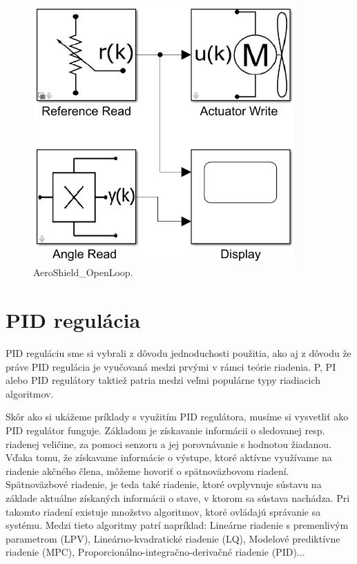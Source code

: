 \begin{figure}[!tbh]
	\centering
	\includegraphics[width=100mm]{obr/AeroOpenLoop.png}
	\caption{AeroShield\_OpenLoop.}\label{OBRAZOK 2.6.111}
\end{figure}



\chapter{PID regulácia}
\label{PIDPID}

PID reguláciu sme si vybrali z dôvodu jednoduchosti použitia, ako aj z dôvodu že práve PID regulácia je vyučovaná medzi prvými v rámci teórie riadenia. P, PI alebo PID regulátory taktiež patria medzi veľmi populárne typy riadiacich algoritmov.  

Skôr ako si ukážeme príklady s využitím PID regulátora, musíme si vysvetliť ako PID regulátor funguje. Základom je získavanie informácii o sledovanej resp. riadenej veličine, za pomoci senzoru a jej porovnávanie s hodnotou žiadanou. Vďaka tomu, že získavame informácie o výstupe, ktoré aktívne využívame na riadenie akčného člena, môžeme hovoriť o spätnoväzbovom riadení. Spätnoväzbové riadenie, je teda také riadenie, ktoré ovplyvnuje sústavu na základe aktuálne získaných informácii o stave, v ktorom sa sústava nachádza. Pri takomto riadení existuje množstvo algoritmov, ktoré ovládajú správanie sa systému. Medzi tieto algoritmy patrí napríklad: Lineárne riadenie s premenlivým parametrom (LPV), Lineárno-kvadratické riadenie (LQ), Modelové prediktívne riadenie (MPC), Proporcionálno-integračno-derivačné riadenie (PID)...

